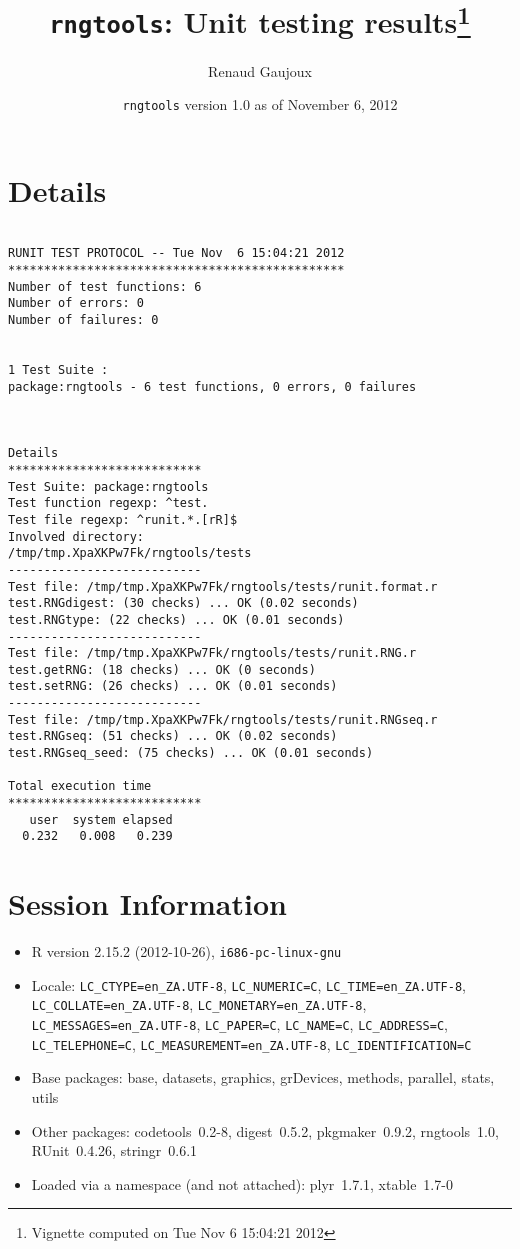 \documentclass[10pt]{article}
\author{Renaud Gaujoux}
\title{\texttt{rngtools}: Unit testing results\footnote{Vignette computed  on Tue Nov  6 15:04:21 2012}}
\date{\texttt{rngtools} version 1.0 as of November  6, 2012}
\begin{document}
\maketitle

\section{Details}
\begin{verbatim}

RUNIT TEST PROTOCOL -- Tue Nov  6 15:04:21 2012 
*********************************************** 
Number of test functions: 6 
Number of errors: 0 
Number of failures: 0 

 
1 Test Suite : 
package:rngtools - 6 test functions, 0 errors, 0 failures



Details 
*************************** 
Test Suite: package:rngtools 
Test function regexp: ^test. 
Test file regexp: ^runit.*.[rR]$ 
Involved directory: 
/tmp/tmp.XpaXKPw7Fk/rngtools/tests 
--------------------------- 
Test file: /tmp/tmp.XpaXKPw7Fk/rngtools/tests/runit.format.r 
test.RNGdigest: (30 checks) ... OK (0.02 seconds)
test.RNGtype: (22 checks) ... OK (0.01 seconds)
--------------------------- 
Test file: /tmp/tmp.XpaXKPw7Fk/rngtools/tests/runit.RNG.r 
test.getRNG: (18 checks) ... OK (0 seconds)
test.setRNG: (26 checks) ... OK (0.01 seconds)
--------------------------- 
Test file: /tmp/tmp.XpaXKPw7Fk/rngtools/tests/runit.RNGseq.r 
test.RNGseq: (51 checks) ... OK (0.02 seconds)
test.RNGseq_seed: (75 checks) ... OK (0.01 seconds)

Total execution time
***************************
   user  system elapsed 
  0.232   0.008   0.239 

\end{verbatim}

\section*{Session Information}
\begin{itemize}\raggedright
  \item R version 2.15.2 (2012-10-26), \verb|i686-pc-linux-gnu|
  \item Locale: \verb|LC_CTYPE=en_ZA.UTF-8|, \verb|LC_NUMERIC=C|, \verb|LC_TIME=en_ZA.UTF-8|, \verb|LC_COLLATE=en_ZA.UTF-8|, \verb|LC_MONETARY=en_ZA.UTF-8|, \verb|LC_MESSAGES=en_ZA.UTF-8|, \verb|LC_PAPER=C|, \verb|LC_NAME=C|, \verb|LC_ADDRESS=C|, \verb|LC_TELEPHONE=C|, \verb|LC_MEASUREMENT=en_ZA.UTF-8|, \verb|LC_IDENTIFICATION=C|
  \item Base packages: base, datasets, graphics, grDevices, methods,
    parallel, stats, utils
  \item Other packages: codetools~0.2-8, digest~0.5.2, pkgmaker~0.9.2,
    rngtools~1.0, RUnit~0.4.26, stringr~0.6.1
  \item Loaded via a namespace (and not attached): plyr~1.7.1,
    xtable~1.7-0
\end{itemize}
\end{document}
